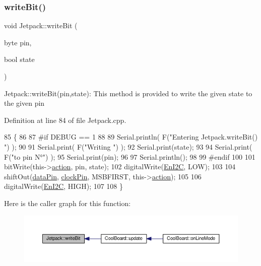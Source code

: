 \subsubsection{\texorpdfstring{write\+Bit()}{writeBit()}}
{\footnotesize\ttfamily void Jetpack\+::write\+Bit (\begin{DoxyParamCaption}\item[{byte}]{pin,  }\item[{bool}]{state }\end{DoxyParamCaption})}

Jetpack\+::write\+Bit(pin,state)\+: This method is provided to write the given state to the given pin 

Definition at line 84 of file Jetpack.\+cpp.


\begin{DoxyCode}
85 \{
86 
87 \textcolor{preprocessor}{#if DEBUG == 1 }
88 
89     Serial.println( F(\textcolor{stringliteral}{"Entering Jetpack.writeBit() "}) );
90 
91     Serial.print( F(\textcolor{stringliteral}{"Writing "}) );
92     Serial.print(state);
93 
94     Serial.print( F(\textcolor{stringliteral}{"to pin N°"}) );
95     Serial.print(pin);
96 
97     Serial.println();
98 
99 \textcolor{preprocessor}{#endif}
100 
101     bitWrite(this->\hyperlink{class_jetpack_aca3142925a7b0834b34ae91d26af7765}{action}, pin, state);
102     digitalWrite(\hyperlink{class_jetpack_a81df984fb4cea98c71aa1a1cfcdfe814}{EnI2C}, LOW);
103     
104     shiftOut(\hyperlink{class_jetpack_a3d669a56e93c71dd25f970d4ed7d0c00}{dataPin}, \hyperlink{class_jetpack_a58ebb991f358f3ae94e82148b0221b5a}{clockPin}, MSBFIRST, this->\hyperlink{class_jetpack_aca3142925a7b0834b34ae91d26af7765}{action});
105 
106     digitalWrite(\hyperlink{class_jetpack_a81df984fb4cea98c71aa1a1cfcdfe814}{EnI2C}, HIGH);
107 
108 \}
\end{DoxyCode}
Here is the caller graph for this function\+:
\nopagebreak
\begin{figure}[H]
\begin{center}
\leavevmode
\includegraphics[width=350pt]{df/d1d/class_jetpack_a79ae7bc3c1828a0551a7c005c4f8bd00_icgraph}
\end{center}
\end{figure}


